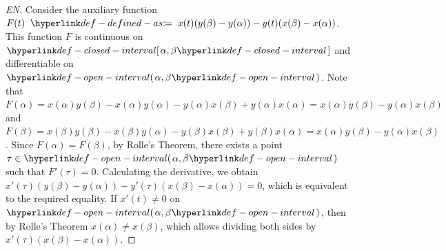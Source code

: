 \begin{proof}[EN]
Consider the auxiliary function $F(t) \TermDefinedAs x(t)(y(\beta) - y(\alpha)) - y(t)(x(\beta) - x(\alpha))$. This function $F$ is continuous on $\ClosedInterval{\alpha, \beta}$ and differentiable on $\OpenInterval{\alpha, \beta}$. Note that $F(\alpha) = x(\alpha)y(\beta) - x(\alpha)y(\alpha) - y(\alpha)x(\beta) + y(\alpha)x(\alpha) = x(\alpha)y(\beta) - y(\alpha)x(\beta)$ and $F(\beta) = x(\beta)y(\beta) - x(\beta)y(\alpha) - y(\beta)x(\beta) + y(\beta)x(\alpha) = x(\alpha)y(\beta) - y(\alpha)x(\beta)$. Since $F(\alpha) = F(\beta)$, by Rolle's Theorem, there exists a point $\tau \in \OpenInterval{\alpha, \beta}$ such that $F'(\tau) = 0$. Calculating the derivative, we obtain $x'(\tau)(y(\beta) - y(\alpha)) - y'(\tau)(x(\beta) - x(\alpha)) = 0$, which is equivalent to the required equality. If $x'(t) \neq 0$ on $\OpenInterval{\alpha, \beta}$, then by Rolle's Theorem $x(\alpha) \neq x(\beta)$, which allows dividing both sides by $x'(\tau)(x(\beta) - x(\alpha))$.
\end{proof}